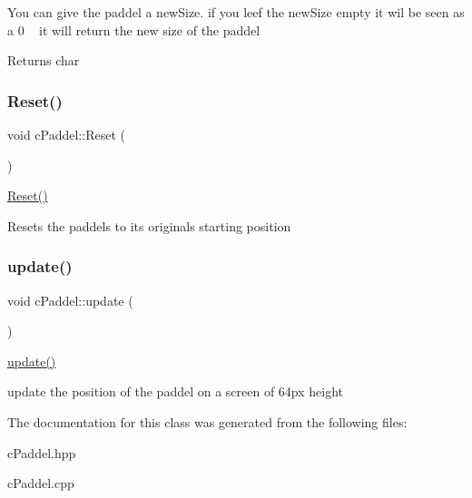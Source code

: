 You can give the paddel a new\+Size. if you leef the new\+Size empty it wil be seen as a 0 ~\newline
it will return the new size of the paddel \begin{DoxyReturn}{Returns}
char 
\end{DoxyReturn}
\mbox{\label{classc_paddel_a4bdcfa64ad3713e749574894d45a8d3b}} 
\subsubsection{\texorpdfstring{Reset()}{Reset()}}
{\footnotesize\ttfamily void c\+Paddel\+::\+Reset (\begin{DoxyParamCaption}{ }\end{DoxyParamCaption})}



\mbox{\hyperlink{classc_paddel_a4bdcfa64ad3713e749574894d45a8d3b}{Reset()}} 

Resets the paddels to its originals starting position \mbox{\label{classc_paddel_a0ef466b341239bf42708ec3e64e942b5}} 
\subsubsection{\texorpdfstring{update()}{update()}}
{\footnotesize\ttfamily void c\+Paddel\+::update (\begin{DoxyParamCaption}{ }\end{DoxyParamCaption})}



\mbox{\hyperlink{classc_paddel_a0ef466b341239bf42708ec3e64e942b5}{update()}} 

update the position of the paddel on a screen of 64px height 

The documentation for this class was generated from the following files\+:\begin{DoxyCompactItemize}
\item 
c\+Paddel.\+hpp\item 
c\+Paddel.\+cpp\end{DoxyCompactItemize}
